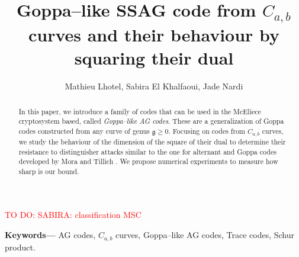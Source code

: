 \documentclass[a4paper]{article}
\title{Goppa--like SSAG code from $C_{a,b}$ curves and their behaviour by squaring their dual}
\author{Mathieu Lhotel, Sabira El Khalfaoui, Jade Nardi}
\date{}
\theoremstyle{definition}
\theoremstyle{remark}
\newcommand\TODO[1]{\textcolor{red}{TO DO: #1}}
\providecommand{\keywords}[1]{\textbf{Keywords---} #1}
\begin{document}
\maketitle
\TODO{SABIRA: classification MSC}
\begin{abstract}
In this paper, we introduce a family of codes that can be used in the McEliece cryptosystem based, called \emph{Goppa--like AG codes}. These are a generalization of Goppa codes constructed from any curve of genus $\mathfrak{g} \geq 0$. Focusing on codes from $C_{a,b}$ curves, we study the behaviour of the dimension of the square of their dual to determine their resistance to distinguisher attacks similar to the one for alternant and Goppa codes developed by Mora and Tillich \cite{MT21}. We propose numerical experiments to measure how sharp is our bound.
\end{abstract}
 
\keywords{AG codes, $C_{a,b}$ curves, Goppa--like AG codes, Trace codes, Schur product.}
\end{document}
